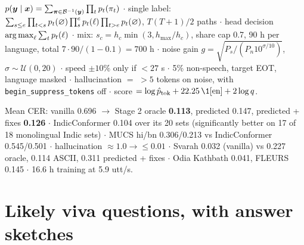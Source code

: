 \begin{tcolorbox}[colback=white,colframe=titleblue,title={CTC, data, robustness, LID rule}]
$p(\bm{y}\mid\bm{x})=\sum_{\bm\pi\in\mathcal B^{-1}(\bm{y})}\prod_tp_t(\pi_t)$ $\cdot$ single label: $\sum_{s\le e}\prod_{t<s}p_t(\varnothing)\prod_{s}^{e}p_t(\ell)\prod_{t>e}p_t(\varnothing)$,
$T(T+1)/2$ paths $\cdot$ head decision $\operatorname*{arg\,max}_\ell\sum_tp_t(\ell)$ $\cdot$ mix: $s_c=h_c\min(3,h_{\max}/h_c)$, share cap 0.7, 90 h per
language, total $7\cdot90/(1-0.1)=700$ h $\cdot$ noise gain $g=\sqrt{P_s/(P_n10^{\sigma/10})}$, $\sigma\sim\mathcal U(0,20)$ $\cdot$
speed $\pm10\%$ only if $<27$ s $\cdot$ 5\% non-speech, target EOT, language masked $\cdot$ hallucination $=$ $>5$ tokens on noise,
with \texttt{begin\_suppress\_tokens} off $\cdot$ score $=\log\hat p_{\text{tok}}+22.25\,\1[\text{en}]+2\log q$.
\end{tcolorbox}

\begin{tcolorbox}[colback=white,colframe=titleblue,title={Headline numbers (test, 23 sets $\times$ 100 utterances)}]
Mean CER: vanilla 0.696 $\to$ Stage 2 oracle \textbf{0.113}, predicted 0.147, predicted + fixes \textbf{0.126} $\cdot$
IndicConformer 0.104 over its 20 sets (significantly better on 17 of 18 monolingual Indic sets) $\cdot$ MUCS hi/bn 0.306/0.213 vs
IndicConformer 0.545/0.501 $\cdot$ hallucination $\approx1.0\to\le0.01$ $\cdot$ Svarah 0.032 (vanilla) vs 0.227 oracle, 0.114 ASCII,
0.311 predicted + fixes $\cdot$ Odia Kathbath 0.041, FLEURS 0.145 $\cdot$ 16.6 h training at 5.9 utt/s.
\end{tcolorbox}

\section{Likely viva questions, with answer sketches}

